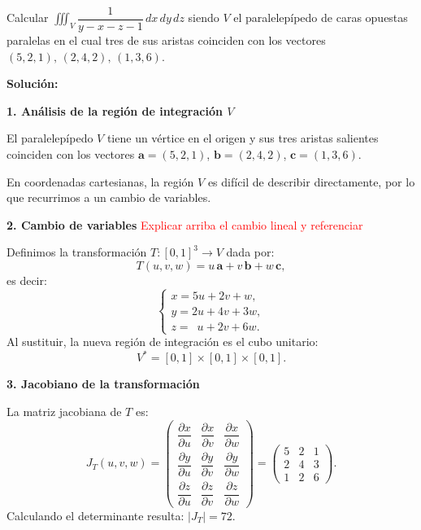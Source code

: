 

\vspace{0.5 cm}

\begin{example} Calcular $\displaystyle\iiint_{V} \dfrac{1}{y - x - z - 1}\, dx\, dy\, dz$ siendo $V$ el paralelepípedo de caras opuestas
paralelas en el cual tres de sus aristas coinciden con los vectores $(5,2,1),\,(2,4,2),\,(1,3,6)$.
\end{example}

\textbf{Soluci\'on:}
\bigskip

\textbf{1. Análisis de la región de integración $V$}

\medskip

El paralelepípedo $V$ tiene un vértice en el origen y sus tres aristas salientes coinciden con los
vectores $\mathbf{a} = (5,2,1)$, $\mathbf{b} = (2,4,2)$, $\mathbf{c} = (1,3,6)$.

\begin{figure}[htbp]
    \centering
     
    \label{fig:Ejemplo 8.2.7}
\end{figure}


En coordenadas cartesianas, la región $V$ es difícil de describir directamente, por lo que
recurrimos a un cambio de variables.

\bigskip

\textbf{2. Cambio de variables} \textcolor{red}{Explicar arriba el cambio lineal y referenciar}

\medskip

Definimos la transformación $T: [0,1]^3 \to V$ dada por:
\[
    T(u,v,w) = u\,\mathbf{a} + v\,\mathbf{b} + w\,\mathbf{c},
\]
es decir:
\[
    \begin{cases}
        x = 5u + 2v + w,\\[4pt]
        y = 2u + 4v + 3w,\\[4pt]
        z = \phantom{5}u + 2v + 6w.
    \end{cases}
\]
Al sustituir, la nueva región de integración es el cubo unitario:
\[
    V^* = [0,1] \times [0,1] \times [0,1].
\]

\bigskip

\textbf{3. Jacobiano de la transformación}

\medskip

La matriz jacobiana de $T$ es:
\[
    J_T(u,v,w) =
    \begin{pmatrix}
        \dfrac{\partial x}{\partial u} & \dfrac{\partial x}{\partial v} & \dfrac{\partial x}{\partial w}\\[10pt]
        \dfrac{\partial y}{\partial u} & \dfrac{\partial y}{\partial v} & \dfrac{\partial y}{\partial w}\\[10pt]
        \dfrac{\partial z}{\partial u} & \dfrac{\partial z}{\partial v} & \dfrac{\partial z}{\partial w}
    \end{pmatrix}
    =
    \begin{pmatrix}
        5 & 2 & 1 \\
        2 & 4 & 3 \\
        1 & 2 & 6
    \end{pmatrix}.
\]
Calculando el determinante resulta: $|J_T| = 72$.
\bigskip

